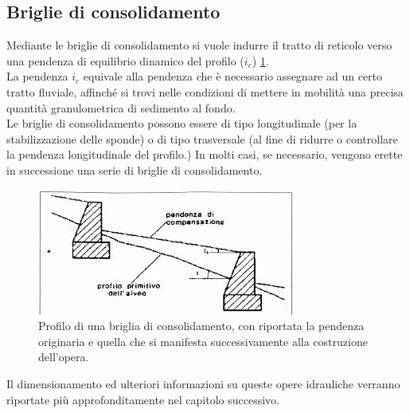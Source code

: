 \subsection{Briglie di consolidamento}
Mediante le briglie di consolidamento si vuole indurre il tratto di reticolo verso una pendenza di equilibrio dinamico del profilo ($i_c$) \ref{profilo_briglia_consolidamento}.\\
La pendenza $i_c$ equivale alla pendenza che è necessario assegnare ad un certo tratto fluviale, affinché si trovi nelle condizioni di mettere in mobilità una precisa quantità granulometrica di sedimento al fondo.\\
Le briglie di consolidamento possono essere di tipo longitudinale (per la stabilizzazione delle sponde) o di tipo trasversale (al fine di ridurre o controllare la pendenza longitudinale del profilo.)
In molti casi, se necessario, vengono erette in successione una serie di briglie di consolidamento.

\begin{figure}[H] \centering
    \includegraphics[scale=1]{immagini/profilo_briglia_consolidamento.jpg}
    \caption{Profilo di una briglia di consolidamento, con riportata la pendenza originaria e quella che si manifesta successivamente alla costruzione dell'opera.}
    \label{profilo_briglia_consolidamento}
\end{figure}

Il dimensionamento ed ulteriori informazioni su queste opere idrauliche verranno riportate più approfonditamente nel capitolo successivo.

